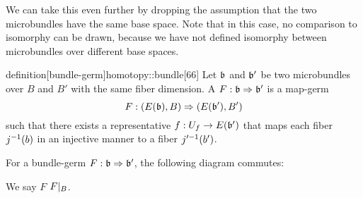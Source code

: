 \begin{myparagraph} We can take this even further by dropping the assumption that the two microbundles have the same base space. Note that in this case, no comparison to isomorphy can be drawn, because we have not defined isomorphy between microbundles over different base spaces. \end{myparagraph}

\begin{mystatement}{definition}[bundle-germ]{homotopy::bundle}[66] Let $\bb$ and $\bb'$ be two microbundles over $B$ and $B'$ with the same fiber dimension. A  $\germdef{F}{\bb}{\bb'}$ is a map-germ \[ \germdef{F}{(E(\bb), B)}{(E(\bb'), B')} \] such that there exists a representative $f: U_f \to E(\bb')$ that maps each fiber $j^{-1}(b)$ in an injective manner to a fiber $j'^{-1}(b')$. \end{mystatement}

\begin{myparagraph} For a bundle-germ $\germdef{F}{\bb}{\bb'}$, the following diagram commutes: \begin{center}  \end{center} We say $F$  $F\vert_{B}$. \end{myparagraph}